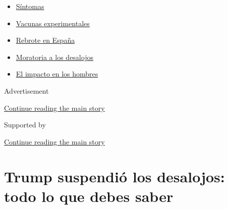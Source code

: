 \begin{itemize}
\tightlist
\item
  \href{https://www.nytimes3xbfgragh.onion/es/interactive/2020/08/06/espanol/ciencia-y-tecnologia/tengo-covid-19-sintomas.html?name=styln-coronavirus-es\&region=TOP_BANNER\&block=storyline_menu_recirc\&action=click\&pgtype=Article\&impression_id=3017e561-f2bb-11ea-8c2a-475020e0db7d\&variant=undefined}{Síntomas}
\item
  \href{https://www.nytimes3xbfgragh.onion/es/2020/09/02/espanol/ciencia-y-tecnologia/vacunas-experimentales-coronavirus.html?name=styln-coronavirus-es\&region=TOP_BANNER\&block=storyline_menu_recirc\&action=click\&pgtype=Article\&impression_id=3017e562-f2bb-11ea-8c2a-475020e0db7d\&variant=undefined}{Vacunas
  experimentales}
\item
  \href{https://www.nytimes3xbfgragh.onion/es/2020/08/31/espanol/mundo/rebrote-espana.html?name=styln-coronavirus-es\&region=TOP_BANNER\&block=storyline_menu_recirc\&action=click\&pgtype=Article\&impression_id=30180c70-f2bb-11ea-8c2a-475020e0db7d\&variant=undefined}{Rebrote
  en España}
\item
  \href{https://www.nytimes3xbfgragh.onion/es/2020/09/02/espanol/negocios/desalojos-trump.html?name=styln-coronavirus-es\&region=TOP_BANNER\&block=storyline_menu_recirc\&action=click\&pgtype=Article\&impression_id=30180c71-f2bb-11ea-8c2a-475020e0db7d\&variant=undefined}{Moratoria
  a los desalojos}
\item
  \href{https://www.nytimes3xbfgragh.onion/es/2020/08/26/espanol/ciencia-y-tecnologia/coronavirus-afecta-hombres.html?name=styln-coronavirus-es\&region=TOP_BANNER\&block=storyline_menu_recirc\&action=click\&pgtype=Article\&impression_id=30180c72-f2bb-11ea-8c2a-475020e0db7d\&variant=undefined}{El
  impacto en los hombres}
\end{itemize}

Advertisement

\protect\hyperlink{after-top}{Continue reading the main story}

Supported by

\protect\hyperlink{after-sponsor}{Continue reading the main story}

\hypertarget{trump-suspendiuxf3-los-desalojos-todo-lo-que-debes-saber}{%
\section{Trump suspendió los desalojos: todo lo que debes
saber}\label{trump-suspendiuxf3-los-desalojos-todo-lo-que-debes-saber}}

